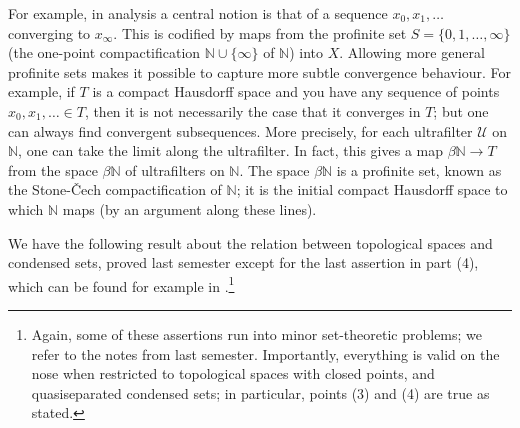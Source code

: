 \documentclass[11pt]{amsbook}
\numberwithin{equation}{section}
\numberwithin{theorem}{section}
\theoremstyle{definition}
\begin{document}
For example, in analysis a central notion is that of a sequence $x_0,x_1,\ldots$ converging to $x_\infty$. This is codified by maps from the profinite set $S=\{0,1,\ldots,\infty\}$ (the one-point compactification $\mathbb N\cup \{\infty\}$ of $\mathbb N$) into $X$. Allowing more general profinite sets makes it possible to capture more subtle convergence behaviour. For example, if $T$ is a compact Hausdorff space and you have any sequence of points $x_0,x_1,\ldots\in T$, then it is not necessarily the case that it converges in $T$; but one can always find convergent subsequences. More precisely, for each ultrafilter $\mathcal U$ on $\mathbb N$, one can take the limit along the ultrafilter. In fact, this gives a map $\beta \mathbb N\to T$ from the space $\beta \mathbb N$ of ultrafilters on $\mathbb N$. The space $\beta \mathbb N$ is a profinite set, known as the Stone-\v{C}ech compactification of $\mathbb N$; it is the initial compact Hausdorff space to which $\mathbb N$ maps (by an argument along these lines).

We have the following result about the relation between topological spaces and condensed sets, proved last semester except for the last assertion in part (4), which can be found for example in \cite[Lemma 4.3.7]{BhattScholzeProetale}.\footnote{Again, some of these assertions run into minor set-theoretic problems; we refer to the notes from last semester. Importantly, everything is valid on the nose when restricted to topological spaces with closed points, and quasiseparated condensed sets; in particular, points (3) and (4) are true as stated.}
\end{document}
